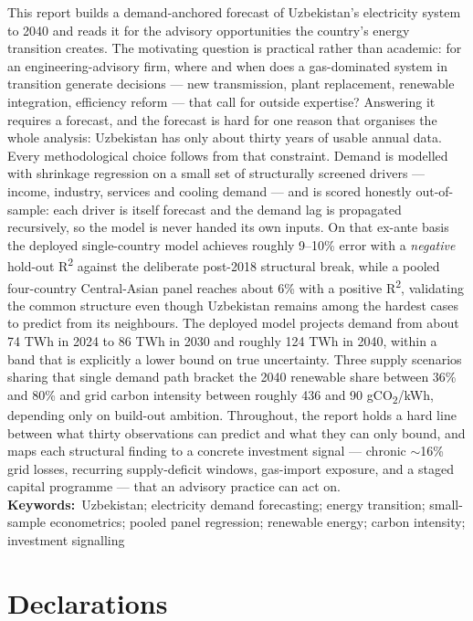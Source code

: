 \documentclass[10pt,twocolumn]{article}
\begin{document}
This report builds a demand-anchored forecast of Uzbekistan's electricity system to 2040 and reads it for the advisory opportunities the country's energy transition creates. The motivating question is practical rather than academic: for an engineering-advisory firm, where and when does a gas-dominated system in transition generate decisions --- new transmission, plant replacement, renewable integration, efficiency reform --- that call for outside expertise? Answering it requires a forecast, and the forecast is hard for one reason that organises the whole analysis: Uzbekistan has only about thirty years of usable annual data. Every methodological choice follows from that constraint. Demand is modelled with shrinkage regression on a small set of structurally screened drivers --- income, industry, services and cooling demand --- and is scored honestly out-of-sample: each driver is itself forecast and the demand lag is propagated recursively, so the model is never handed its own inputs. On that ex-ante basis the deployed single-country model achieves roughly 9--10\% error with a \textit{negative} hold-out R\textsuperscript{2} against the deliberate post-2018 structural break, while a pooled four-country Central-Asian panel reaches about 6\% with a positive R\textsuperscript{2}, validating the common structure even though Uzbekistan remains among the hardest cases to predict from its neighbours. The deployed model projects demand from about 74 TWh in 2024 to 86 TWh in 2030 and roughly 124 TWh in 2040, within a band that is explicitly a lower bound on true uncertainty. Three supply scenarios sharing that single demand path bracket the 2040 renewable share between 36\% and 80\% and grid carbon intensity between roughly 436 and 90 gCO\textsubscript{2}/kWh, depending only on build-out ambition. Throughout, the report holds a hard line between what thirty observations can predict and what they can only bound, and maps each structural finding to a concrete investment signal --- chronic $\sim$16\% grid losses, recurring supply-deficit windows, gas-import exposure, and a staged capital programme --- that an advisory practice can act on.
\vspace{4pt}\noindent\textbf{Keywords:}~Uzbekistan; electricity demand forecasting; energy transition; small-sample econometrics; pooled panel regression; renewable energy; carbon intensity; investment signalling
\section*{Declarations}
\end{document}
